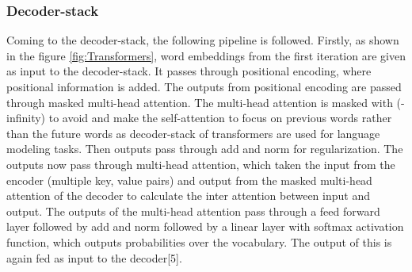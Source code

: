 \subsubsection{Decoder-stack}
Coming to the decoder-stack, the following pipeline is followed. Firstly, as shown in the figure \ref{fig:Transformers}, word embeddings from the first iteration are given as input to the decoder-stack. It passes through positional encoding, where positional information is added. The outputs from positional encoding are passed through masked multi-head attention. The multi-head attention is masked with (-infinity) to avoid and make the self-attention to focus on previous words rather than the future words as decoder-stack of transformers are used for language modeling tasks. Then outputs pass through add and norm for regularization. The outputs now pass through multi-head attention, which taken the input from the encoder (multiple key, value pairs) and output from the masked multi-head attention of the decoder to calculate the inter attention between input and output. The outputs of the multi-head attention pass through a feed forward layer followed by add and norm followed by a linear layer with softmax activation function, which outputs probabilities over the vocabulary. The output of this is again fed as input to the decoder[5]\cite{vaswani2017attention}. 





